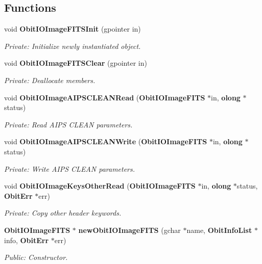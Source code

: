 \subsection*{Functions}
\begin{CompactItemize}
\item 
void {\bf Obit\-IOImage\-FITSInit} (gpointer in)
\begin{CompactList}\small\item\em Private: Initialize newly instantiated object. \item\end{CompactList}\item 
void {\bf Obit\-IOImage\-FITSClear} (gpointer in)
\begin{CompactList}\small\item\em Private: Deallocate members. \item\end{CompactList}\item 
void {\bf Obit\-IOImage\-AIPSCLEANRead} ({\bf Obit\-IOImage\-FITS} $\ast$in, {\bf olong} $\ast$status)
\begin{CompactList}\small\item\em Private: Read AIPS CLEAN parameters. \item\end{CompactList}\item 
void {\bf Obit\-IOImage\-AIPSCLEANWrite} ({\bf Obit\-IOImage\-FITS} $\ast$in, {\bf olong} $\ast$status)
\begin{CompactList}\small\item\em Private: Write AIPS CLEAN parameters. \item\end{CompactList}\item 
void {\bf Obit\-IOImage\-Keys\-Other\-Read} ({\bf Obit\-IOImage\-FITS} $\ast$in, {\bf olong} $\ast$status, {\bf Obit\-Err} $\ast$err)
\begin{CompactList}\small\item\em Private: Copy other header keywords. \item\end{CompactList}\item 
{\bf Obit\-IOImage\-FITS} $\ast$ {\bf new\-Obit\-IOImage\-FITS} (gchar $\ast$name, {\bf Obit\-Info\-List} $\ast$info, {\bf Obit\-Err} $\ast$err)
\begin{CompactList}\small\item\em Public: Constructor. \item\end{CompactList}\item 

\end{CompactItemize}
